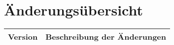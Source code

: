 \chapter*{Änderungsübersicht}
\begin{tabular}{|l|l|}
\hline 
\textbf{Version} & \textbf{Beschreibung der Änderungen} \\ 
\hline 

\end{tabular} 